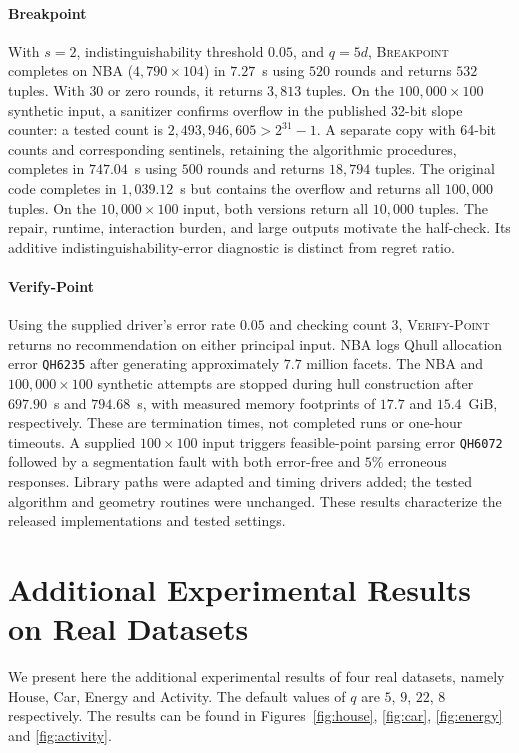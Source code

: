 \paragraph{Breakpoint}
With $s=2$, indistinguishability threshold $0.05$, and $q=5d$, \textsc{Breakpoint} completes on NBA ($4{,}790\times104$) in $7.27$~s using $520$ rounds and returns $532$ tuples. With $30$ or zero rounds, it returns $3{,}813$ tuples. On the $100{,}000\times100$ synthetic input, a sanitizer confirms overflow in the published 32-bit slope counter: a tested count is $2{,}493{,}946{,}605>2^{31}-1$. A separate copy with 64-bit counts and corresponding sentinels, retaining the algorithmic procedures, completes in $747.04$~s using $500$ rounds and returns $18{,}794$ tuples. The original code completes in $1{,}039.12$~s but contains the overflow and returns all $100{,}000$ tuples. On the $10{,}000\times100$ input, both versions return all $10{,}000$ tuples. The repair, runtime, interaction burden, and large outputs motivate the half-check. Its additive indistinguishability-error diagnostic is distinct from regret ratio.

\paragraph{Verify-Point}
Using the supplied driver's error rate $0.05$ and checking count $3$, \textsc{Verify-Point} returns no recommendation on either principal input. NBA logs Qhull allocation error \texttt{QH6235} after generating approximately $7.7$ million facets. The NBA and $100{,}000\times100$ synthetic attempts are stopped during hull construction after $697.90$~s and $794.68$~s, with measured memory footprints of $17.7$ and $15.4$~GiB, respectively. These are termination times, not completed runs or one-hour timeouts. A supplied $100\times100$ input triggers feasible-point parsing error \texttt{QH6072} followed by a segmentation fault with both error-free and $5\%$ erroneous responses. Library paths were adapted and timing drivers added; the tested algorithm and geometry routines were unchanged. These results characterize the released implementations and tested settings.

\section{Additional Experimental Results on Real Datasets}
\label{appen:real}

We present here the additional experimental results of four real datasets, namely House, Car, Energy and Activity. The default values of $q$ are $5$, $9$, $22$, $8$ respectively. The results can be found in Figures~\ref{fig:house}, \ref{fig:car}, \ref{fig:energy} and \ref{fig:activity}.

